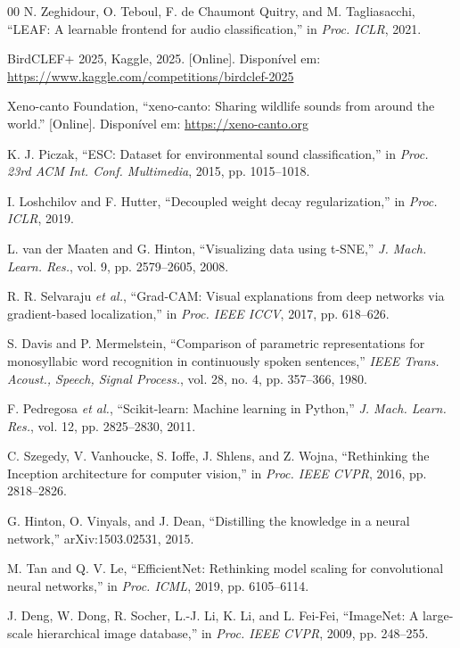 \documentclass[conference]{IEEEtran}
\begin{document}
\begin{thebibliography}{00}
 N. Zeghidour, O. Teboul, F. de Chaumont Quitry, and M. Tagliasacchi, ``LEAF: A learnable frontend for audio classification,'' in \textit{Proc. ICLR}, 2021.

 BirdCLEF+ 2025, Kaggle, 2025. [Online]. Disponível em: \url{https://www.kaggle.com/competitions/birdclef-2025}

 Xeno-canto Foundation, ``xeno-canto: Sharing wildlife sounds from around the world.'' [Online]. Disponível em: \url{https://xeno-canto.org}

 K. J. Piczak, ``ESC: Dataset for environmental sound classification,'' in \textit{Proc. 23rd ACM Int. Conf. Multimedia}, 2015, pp. 1015--1018.

 I. Loshchilov and F. Hutter, ``Decoupled weight decay regularization,'' in \textit{Proc. ICLR}, 2019.

 L. van der Maaten and G. Hinton, ``Visualizing data using t-SNE,'' \textit{J. Mach. Learn. Res.}, vol. 9, pp. 2579--2605, 2008.

 R. R. Selvaraju \textit{et al.}, ``Grad-CAM: Visual explanations from deep networks via gradient-based localization,'' in \textit{Proc. IEEE ICCV}, 2017, pp. 618--626.

 S. Davis and P. Mermelstein, ``Comparison of parametric representations for monosyllabic word recognition in continuously spoken sentences,'' \textit{IEEE Trans. Acoust., Speech, Signal Process.}, vol. 28, no. 4, pp. 357--366, 1980.

 F. Pedregosa \textit{et al.}, ``Scikit-learn: Machine learning in Python,'' \textit{J. Mach. Learn. Res.}, vol. 12, pp. 2825--2830, 2011.

 C. Szegedy, V. Vanhoucke, S. Ioffe, J. Shlens, and Z. Wojna, ``Rethinking the Inception architecture for computer vision,'' in \textit{Proc. IEEE CVPR}, 2016, pp. 2818--2826.

 G. Hinton, O. Vinyals, and J. Dean, ``Distilling the knowledge in a neural network,'' arXiv:1503.02531, 2015.

 M. Tan and Q. V. Le, ``EfficientNet: Rethinking model scaling for convolutional neural networks,'' in \textit{Proc. ICML}, 2019, pp. 6105--6114.

 J. Deng, W. Dong, R. Socher, L.-J. Li, K. Li, and L. Fei-Fei, ``ImageNet: A large-scale hierarchical image database,'' in \textit{Proc. IEEE CVPR}, 2009, pp. 248--255.


\end{thebibliography}
\end{document}
